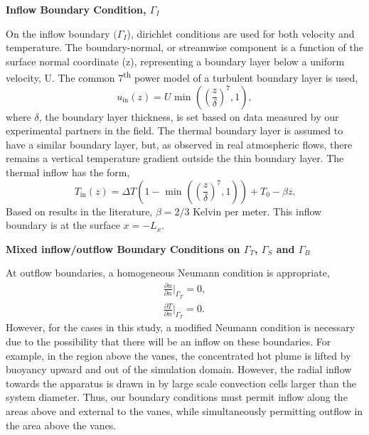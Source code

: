 \textbf{Inflow Boundary Condition, $\Gamma_I$} 

On the inflow boundary $(\Gamma_I$), dirichlet conditions are used for
both velocity and temperature. The boundary-normal, or streamwise
component is a function of the surface normal coordinate (z),
representing a boundary layer below a uniform velocity, U.
The common 7\textsuperscript{th} power model of a turbulent boundary
layer is used,    
\begin{equation*}
  u_{\text{in}}(z) = U \text{ min }\left(\left(\frac{z}{\delta}\right)^7,1\right),
  \label{eq:bl_u}
\end{equation*}
where $\delta$, the boundary layer thickness, is set based on data
measured by our experimental partners in the field. 
The thermal boundary layer is assumed to have a similar boundary layer,
but, as observed in real atmospheric flows, there remains a vertical
temperature gradient outside the thin boundary layer. 
The thermal inflow has the form,
\begin{equation*}
  T_{\text{in}}(z) = \Delta T \left(1- \text{ min
			}\left(\left(\frac{z}{\delta}\right)^7,1\right)\right)
  + T_0 - \beta z.  
  \label{eq:bl_t}
\end{equation*}
Based on results in the literature, $\beta = 2/3$ Kelvin per 
meter\cite{Blocken2007238}.
This inflow boundary is at the surface $x=-L_x$.

\textbf{Mixed inflow/outflow Boundary Conditions on $\Gamma_T$,
$\Gamma_S$ and $\Gamma_B$}  

At outflow boundaries, a homogeneous Neumann condition is
appropriate\cite{Rannacher2000}, 
\begin{align}
  \frac{\partial u}{\partial n}\bigg|_{\Gamma_T} = 0, \\
  \frac{\partial T}{\partial n}\bigg|_{\Gamma_T} = 0.
\end{align}
However, for the cases in this study, a modified Neumann condition is
necessary due to the possibility that there will be an inflow on these
boundaries. 
For example, in the region above the vanes, the concentrated hot plume is
lifted by buoyancy upward and out of the simulation domain. However, the
radial inflow towards the apparatus is drawn in by large scale
convection cells larger than the system diameter. Thus, our boundary
conditions must permit inflow along the areas above and external to the
vanes, while simultaneously permitting outflow in the area above the vanes. 



